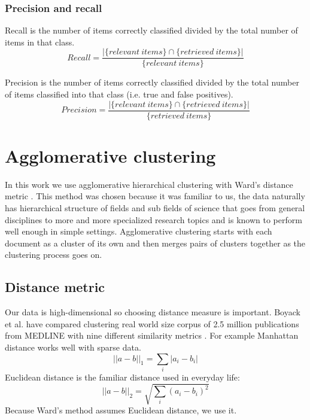 \subsubsection{Precision and recall}
Recall is the number of items correctly classified divided by the 
total number of items in that class.
\begin{equation}
 Recall = \frac{|\{relevant\ items\} \cap \{retrieved\ items\}|} 
{\{relevant\ items\}}
\end{equation}

Precision is the number of items correctly classified divided by 
the total number of items classified into that class (i.e. true and 
false positives).
\begin{equation}
 Precision = \frac{|\{relevant\ items\} \cap \{retrieved\ 
items\}|} 
{\{retrieved\ items\}}
\end{equation}


\section{Agglomerative clustering}
\label{sec:agglomerativeclustering}
In this work we use agglomerative hierarchical clustering with 
Ward's distance metric \cite{ward_jr_hierarchical_1963}. This 
method was chosen because it was familiar to us, the data naturally 
has hierarchical structure of fields and sub fields of science that 
goes from general disciplines to more and more specialized research
topics and is known to perform well enough in simple settings. 
Agglomerative clustering starts with each document 
as a cluster of its own and then merges pairs of clusters together 
as the clustering process goes on.


\subsection{Distance metric}
Our data is high-dimensional so choosing distance measure is 
important. 
Boyack et al. have compared clustering real world size corpus of 
2.5 million publications from MEDLINE with nine different 
similarity metrics \cite{boyack_clustering_2011}.
For example Manhattan distance works well with sparse data.
\begin{equation}
 ||a-b||_1 = \sum_i{|a_i-b_i|}
\end{equation}
Euclidean distance is the familiar distance used in everyday life:
\begin{equation}
 ||a-b||_2 = \sqrt{\sum_i{(a_i-b_i)^2}}
\end{equation}
Because Ward's method assumes Euclidean distance, we use it.

